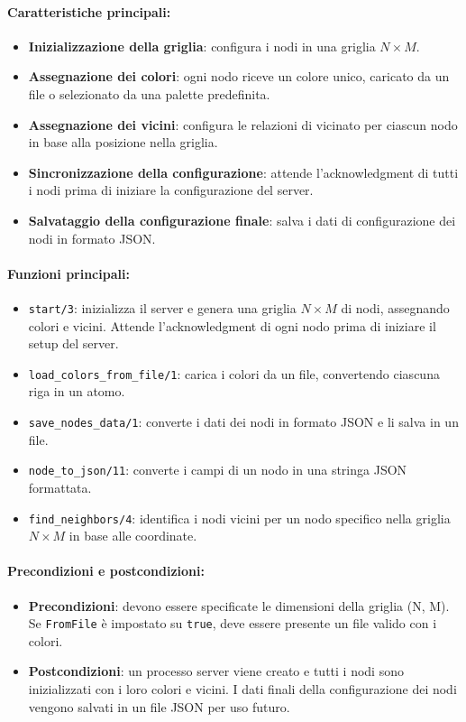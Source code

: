 \documentclass[12pt, a4paper]{report}
\begin{document}
\paragraph{Caratteristiche principali:}
\begin{itemize}
    \item \textbf{Inizializzazione della griglia}: configura i nodi in una griglia $N \times M$.
    \item \textbf{Assegnazione dei colori}: ogni nodo riceve un colore unico, caricato da un file o selezionato da una palette predefinita.
    \item \textbf{Assegnazione dei vicini}: configura le relazioni di vicinato per ciascun nodo in base alla posizione nella griglia.
    \item \textbf{Sincronizzazione della configurazione}: attende l'acknowledgment di tutti i nodi prima di iniziare la configurazione del server.
    \item \textbf{Salvataggio della configurazione finale}: salva i dati di configurazione dei nodi in formato JSON.
\end{itemize}

\paragraph{Funzioni principali:}
\begin{itemize}
    \item \texttt{start/3}: inizializza il server e genera una griglia $N \times M$ di nodi, assegnando colori e vicini. Attende l'acknowledgment di ogni nodo prima di iniziare il setup del server.
    \item \texttt{load\_colors\_from\_file/1}: carica i colori da un file, convertendo ciascuna riga in un atomo.
    \item \texttt{save\_nodes\_data/1}: converte i dati dei nodi in formato JSON e li salva in un file.
    \item \texttt{node\_to\_json/11}: converte i campi di un nodo in una stringa JSON formattata.
    \item \texttt{find\_neighbors/4}: identifica i nodi vicini per un nodo specifico nella griglia $N \times M$ in base alle coordinate.
\end{itemize}

\paragraph{Precondizioni e postcondizioni:}
\begin{itemize}
    \item \textbf{Precondizioni}: devono essere specificate le dimensioni della griglia (N, M). Se \texttt{FromFile} \`e impostato su \texttt{true}, deve essere presente un file valido con i colori.
    \item \textbf{Postcondizioni}: un processo server viene creato e tutti i nodi sono inizializzati con i loro colori e vicini. I dati finali della configurazione dei nodi vengono salvati in un file JSON per uso futuro.
\end{itemize}
\end{document}
